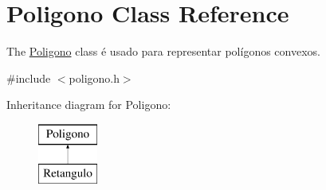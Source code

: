 \hypertarget{class_poligono}{}\section{Poligono Class Reference}
\label{class_poligono}


The \mbox{\hyperlink{class_poligono}{Poligono}} class é usado para representar polígonos convexos.  




{\ttfamily \#include $<$poligono.\+h$>$}

Inheritance diagram for Poligono\+:\begin{figure}[H]
\begin{center}
\leavevmode
\includegraphics[height=2.000000cm]{class_poligono}
\end{center}
\end{figure}
